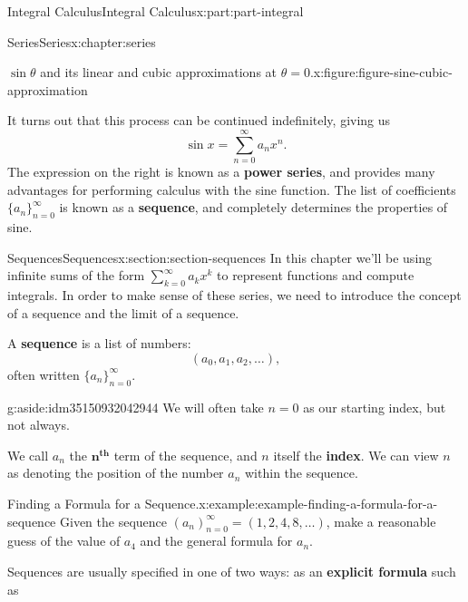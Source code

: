 \documentclass[twoside,10pt,]{book}
\newcommand{\terminology}[1]{\textbf{#1}}
\numberwithin{equation}{part}
\begin{document}
\begin{partptx}{Integral Calculus}{}{Integral Calculus}{}{}{x:part:part-integral}
\begin{chapterptx}{Series}{}{Series}{}{}{x:chapter:series}
\begin{introduction}{}
\begin{figureptx}{\(\sin\theta\) and its linear and cubic approximations at \(\theta=0\).}{x:figure:figure-sine-cubic-approximation}{}
\begin{image}{0}{1}{0}
{
}%
\end{image}%
\tcblower
\end{figureptx}%
It turns out that this process can be continued indefinitely, giving us%
\begin{equation*}
\sin x = \sum_{n=0}^{\infty}a_{n}x^{n}.
\end{equation*}
The expression on the right is known as a \terminology{power series}, and provides many advantages for performing calculus with the sine function. The list of coefficients \(\{a_{n}\}_{n=0}^{\infty}\) is known as a \terminology{sequence}, and completely determines the properties of sine.%
\end{introduction}%
%
%
\typeout{************************************************}
\typeout{************************************************}
%
\begin{sectionptx}{Sequences}{}{Sequences}{}{}{x:section:section-sequences}
In this chapter we'll be using infinite sums of the form \(\sum_{k=0}^{\infty}a_k x^k\) to represent functions and compute integrals. In order to make sense of these series, we need to introduce the concept of a sequence and the limit of a sequence.%
\par
A \terminology{sequence} is a list of numbers:%
\begin{equation*}
(a_{0}, a_{1}, a_{2}, \ldots),
\end{equation*}
often written \(\{a_{n}\}_{n=0}^{\infty}\). \begin{aside}{}{g:aside:idm35150932042944}%
We will often take \(n = 0\) as our starting index, but not always.%
\end{aside}
 We call \(a_{n}\) the \(\mathbf{n}^{\textbf{th}}\) term of the sequence, and \(n\) itself the \terminology{index}. We can view \(n\) as denoting the position of the number \(a_n\) within the sequence.%
\begin{example}{Finding a Formula for a Sequence.}{x:example:example-finding-a-formula-for-a-sequence}%
Given the sequence \((a_n)_{n=0}^{\infty} = (1, 2, 4, 8, \ldots)\), make a reasonable guess of the value of \(a_4\) and the general formula for \(a_n\).%
\end{example}
Sequences are usually specified in one of two ways: as an \terminology{explicit formula} such as%
\begin{equation*}

\end{equation*}
\end{sectionptx}
\end{chapterptx}
\end{partptx}
\end{document}
